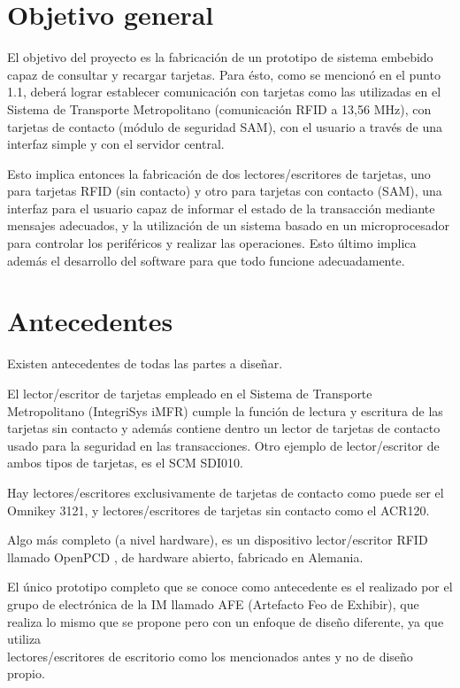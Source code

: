 \section{Objetivo general}

El objetivo del proyecto es la fabricación de un prototipo de sistema embebido capaz de consultar y recargar tarjetas. Para ésto, como se mencionó en el punto 1.1, deberá lograr establecer comunicación con tarjetas  como las utilizadas en el Sistema de Transporte Metropolitano (comunicación RFID a 13,56 MHz), con tarjetas de contacto (módulo de seguridad SAM), con el usuario a través de una interfaz simple y con el servidor central.

\bigskip
Esto implica entonces la fabricación de dos lectores/escritores de tarjetas, uno para tarjetas RFID (sin contacto) y otro para tarjetas con contacto (SAM), una interfaz para el usuario capaz de informar el estado de la transacción mediante mensajes adecuados, y la utilización de un sistema basado en un microprocesador para controlar los periféricos y realizar las operaciones. Esto último implica además el desarrollo del software para que todo funcione adecuadamente.


\section{Antecedentes}

Existen antecedentes de todas las partes a diseñar.

\bigskip
El lector/escritor de tarjetas empleado en el Sistema de Transporte Metropolitano (IntegriSys iMFR) cumple la función de lectura y escritura de las tarjetas sin contacto y además contiene dentro un lector de tarjetas de contacto usado para la seguridad en las transacciones. Otro ejemplo de lector/escritor de ambos tipos de tarjetas,  es el SCM SDI010.

\bigskip
Hay lectores/escritores exclusivamente de tarjetas de contacto como puede ser el Omnikey 3121, y lectores/escritores de tarjetas sin contacto como el ACR120.

\bigskip
Algo más completo (a nivel hardware), es un dispositivo lector/escritor RFID llamado OpenPCD \cite{OpenPCD}, de hardware abierto, fabricado en Alemania.

\bigskip
El único prototipo completo que se conoce como antecedente es el realizado por el grupo de electrónica de la IM llamado AFE (Artefacto Feo de Exhibir), que realiza lo mismo que se propone pero con un enfoque de diseño diferente, ya que utiliza \\
lectores/escritores de escritorio como los mencionados antes y no de diseño propio.


